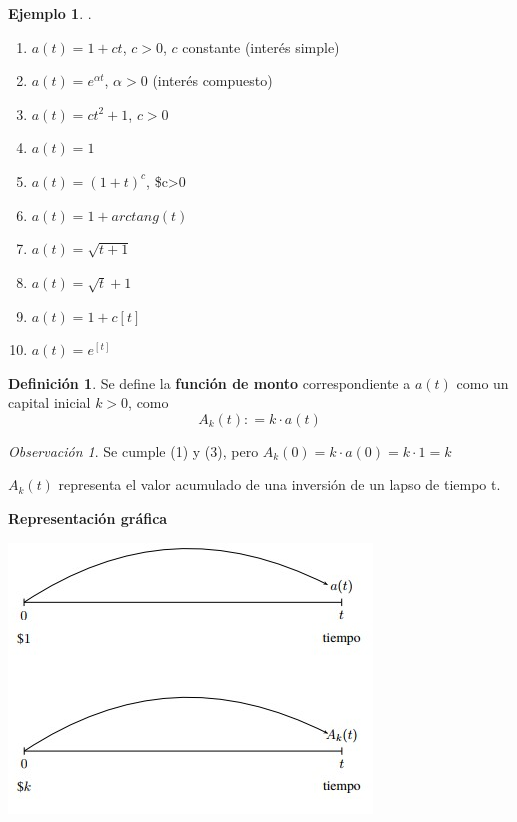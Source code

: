 \documentclass[
]{book}
\theoremstyle{definition}
\newtheorem{definition}{Definición}[chapter]
\theoremstyle{definition}
\newtheorem{example}{Ejemplo}[chapter]
\theoremstyle{definition}
\theoremstyle{definition}
\theoremstyle{remark}
\newtheorem*{remark}{Observación }
\begin{document}
\begin{example}

.

\begin{enumerate}
\def\labelenumi{\arabic{enumi}.}
\item
  \(a(t) = 1+ct\), \(c>0\), \(c\) constante (interés simple)
\item
  \(a(t) = e^{\alpha t}\), \(\alpha > 0\) (interés compuesto)
\item
  \(a(t) = ct^2 + 1\), \(c>0\)
\item
  \(a(t) = 1\)
\item
  \(a(t) = (1+t)^c\), \$c\textgreater0
\item
  \(a(t) = 1 + arctang(t)\)
\item
  \(a(t) = \sqrt{t+1}\)
\item
  \(a(t) = \sqrt{t} + 1\)
\item
  \(a(t) = 1 + c\left[ t \right]\)
\item
  \(a(t) = e^{\left[ t \right]}\)
\end{enumerate}

\end{example}

\begin{definition}
Se define la \textbf{función de monto} correspondiente a \(a(t)\) como un capital inicial \(k>0\), como
\[ A_k \left( t \right) : = k \cdot a \left( t\right)\]
\end{definition}

\begin{remark}
Se cumple (1) y (3), pero \(A_k(0) = k \cdot a(0) = k \cdot 1 = k\)
\end{remark}

\(A_k(t)\) representa el valor acumulado de una inversión de un lapso de tiempo t.

\textbf{Representación gráfica}

\includegraphics{images/1.jpg}
\end{document}
